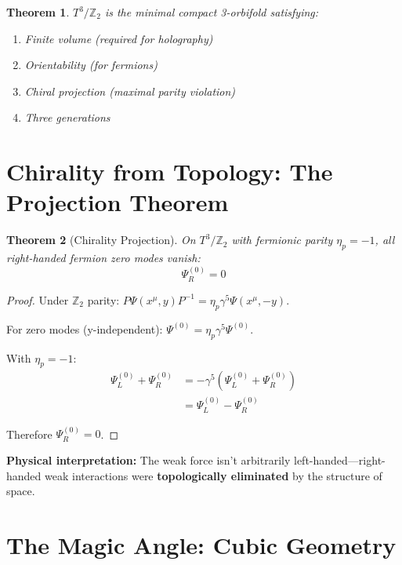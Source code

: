 \documentclass[12pt,a4paper]{article}
\newtheorem{theorem}{Theorem}[section]
\newcommand{\Ztwo}{\mathbb{Z}_2}
\newcommand{\Tthree}{T^3}
\begin{document}
\begin{theorem}
$\Tthree/\Ztwo$ is the minimal compact 3-orbifold satisfying:
\begin{enumerate}
    \item Finite volume (required for holography)
    \item Orientability (for fermions)
    \item Chiral projection (maximal parity violation)
    \item Three generations
\end{enumerate}
\end{theorem}

\section{Chirality from Topology: The Projection Theorem}
\label{sec:chirality}

\begin{theorem}[Chirality Projection]
On $\Tthree/\Ztwo$ with fermionic parity $\eta_p = -1$, all right-handed fermion zero modes vanish:
\begin{equation}
\boxed{\Psi_R^{(0)} = 0}
\end{equation}
\end{theorem}

\begin{proof}
Under $\Ztwo$ parity: $P\Psi(x^\mu, y)P^{-1} = \eta_p \gamma^5 \Psi(x^\mu, -y)$.

For zero modes (y-independent): $\Psi^{(0)} = \eta_p \gamma^5 \Psi^{(0)}$.

With $\eta_p = -1$:
\begin{align}
\Psi_L^{(0)} + \Psi_R^{(0)} &= -\gamma^5(\Psi_L^{(0)} + \Psi_R^{(0)}) \\
&= \Psi_L^{(0)} - \Psi_R^{(0)}
\end{align}

Therefore $\Psi_R^{(0)} = 0$.
\end{proof}

\textbf{Physical interpretation:} The weak force isn't arbitrarily left-handed---right-handed weak interactions were \textbf{topologically eliminated} by the structure of space.

\section{The Magic Angle: Cubic Geometry}
\label{sec:magic}
\end{document}

